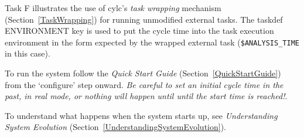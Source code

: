 Task F illustrates the use of cylc's {\em task wrapping} mechanism
(Section~\ref{TaskWrapping}) for running unmodified external tasks. 
The taskdef ENVIRONMENT key is used to put the cycle time
into the task execution environment in the form expected by the wrapped
external task (\lstinline=$ANALYSIS_TIME= in this case). 

To run the system follow the {\em Quick Start Guide}
(Section~\ref{QuickStartGuide}) from the `configure' step onward. 
{\em Be careful to set an initial cycle time in the past, in real mode,
or nothing will happen until until the start time is reached!}.

To understand what happens when the system starts up, see {\em
Understanding System Evolution}
(Section~\ref{UnderstandingSystemEvolution}).
